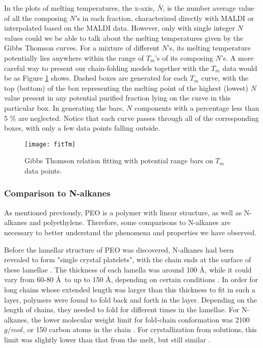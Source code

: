 In the plots of melting temperatures, the x-axis, $\bar{N}$, is the number average value of all the composing $N$'s in each fraction, characterized directly with MALDI or interpolated based on the MALDI data. However, only with single integer $N$ values could we be able to talk about the melting temperatures given by the Gibbs Thomson curves. For a mixture of different $N$'s, its melting temperature potentially lies anywhere within the range of $T_{m}$'s of its composing $N$'s. A more careful way to present our chain-folding models together with the $T_{m}$ data would be as Figure \ref{fig:fitTm} shows. Dashed boxes are generated for each $T_{m}$ curve, with the top (bottom) of the box representing the melting point of the highest (lowest) $N$ value present in any potential purified fraction lying on the curve in this particular box. In generating the bars, $N$ components with a percentage less than 5 \% are neglected. Notice that each curve passes through all of the corresponding boxes, with only a few data points falling outside.

\begin{figure}[H]
\center
\texttt{[image: fitTm]}
\caption{Gibbs Thomson relation fitting with potential range bars on $T_{m}$ data points.}
\label{fig:fitTm}
\end{figure}

\subsubsection{Comparison to N-alkanes}

As mentioned previously, PEO is a polymer with linear structure, as well as N-alkanes and polyethylene. Therefore, some comparisons to N-alkanes are necessary to better understand the phenomena and properties we have observed.

Before the lamellar structure of PEO was discovered, N-alkanes had been revealed to form "single crystal platelets", with the chain ends at the surface of these lamellae \cite{Richardson1965}. The thickness of each lamella was around 100 \AA, while it could vary from 60-80 \AA \ to up to 150 \AA, depending on certain conditions \cite{Keller1957a}. In order for long chains whose extended length was larger than this thickness to fit in such a layer, polymers were found to fold back and forth in the layer. Depending on the length of chains, they needed to fold for different times in the lamellae. For N-alkanes, the lower molecular weight limit for fold-chain conformation was 2100 $g/mol$, or 150 carbon atoms in the chain \cite{Ungar1986}. For crystallization from solutions, this limit was slightly lower than that from the melt, but still similar \cite{Alamo1993}.


